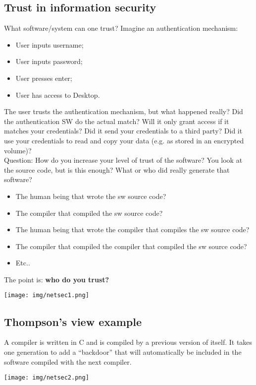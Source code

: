 \documentclass[a4paper, 10pt, titlepage]{article}
\begin{document}
\subsection{Trust in information security}
What software/system can one trust? Imagine an authentication mechanism:
\begin{itemize}
	\item User inputs username;
	\item User inputs password;
	\item User presses enter;
	\item User has access to Desktop.
\end{itemize}
The user trusts the authentication mechanism, but what happened really? Did the authentication SW do the actual match? Will it only grant access if it matches your credentials? Did it send your credentials to a third party? Did it use your credentials to read and copy your data (e.g. as stored in an encrypted volume)? \\
Question: How do you increase your level of trust of the software? You look at the source code, but is this enough?
What or who did really generate that software?
\begin{itemize}
	\item The human being that wrote the sw source code?
	\item The compiler that compiled the sw source code?
	\item The human being that wrote the compiler that compiles
	the sw source code?
	\item The compiler that compiled the compiler that compiled
	the sw source code?
	\item Etc..
\end{itemize}
The point is: \textbf{who do you trust?}
\begin{center}
	\texttt{[image: img/netsec1.png]}
\end{center}

\subsection{Thompson’s view example}
A compiler is written in C and is compiled by a previous version of itself. It takes one generation to add a “backdoor” that will automatically be included in the software compiled with the next compiler.

\begin{center}
	\texttt{[image: img/netsec2.png]}
\end{center}
\end{document}
